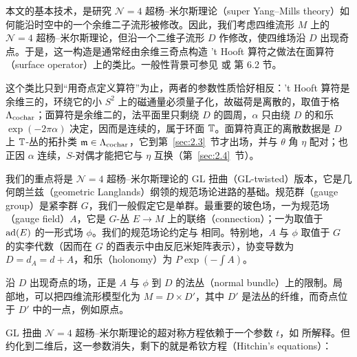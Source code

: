 本文的基本技术，是研究 $\mathcal N=4$ 超杨–米尔斯理论（super Yang–Mills theory）如何能沿时空中的一个余维二子流形被修改。因此，我们考虑四维流形 $M$ 上的 $\mathcal N=4$ 超杨–米尔斯理论，但沿一个二维子流形 $D$ 作修改，使四维场沿 $D$ 出现奇点。于是，这一构造是通常经由余维三奇点构造 't Hooft 算符之做法在面算符（surface operator）上的类比。一般性背景可参见 \cite{ref38} 或 \cite{ref8} 第 6.2 节。

\begin{yizhu}[物理图像补充]
这个类比只到“用奇点定义算符”为止，两者的参数性质恰好相反：'t Hooft 算符是余维三的，环绕它的小 $S^2$ 上的磁通量必须量子化，故磁荷是离散的，取值于格 $\Lambda_{\rm cochar}$；面算符是余维二的，法平面里只剩绕 $D$ 的圆周，$\alpha$ 只由绕 $D$ 的和乐 $\exp(-2\pi\alpha)$ 决定，因而是连续的，属于环面 ${\mathbb{T}}$。面算符真正的离散数据是 $D$ 上 ${\mathbb{T}}$-丛的拓扑类 $\mathfrak m\in\Lambda_{\rm cochar}$，它到第~\ref{sec:2.3}~节才出场，并与 $\theta$ 角 $\eta$ 配对；也正因 $\alpha$ 连续，$S$-对偶才能把它与 $\eta$ 互换（第~\ref{sec:2.4}~节）。
\end{yizhu}

我们的重点将是 $\mathcal N=4$ 超杨–米尔斯理论的 GL 扭曲（GL-twisted）版本，它是几何朗兰兹（geometric Langlands）纲领的规范场论进路的基础。规范群（gauge group）是紧李群 $G$，我们一般假定它是单群。最重要的玻色场，一为规范场（gauge field）$A$，它是 $G$-丛 $E\to M$ 上的联络（connection）；一为取值于 ${\rm ad}(E)$ 的一形式场 $\phi$。我们的规范场论约定与 \cite{ref8} 相同。特别地，$A$ 与 $\phi$ 取值于 $G$ 的实李代数（因而在 $G$ 的酉表示中由反厄米矩阵表示），协变导数为 $D=d_A=d+A$，和乐（holonomy）为 $P\exp\left(-\int A\right)$。

沿 $D$ 出现奇点的场，正是 $A$ 与 $\phi$ 到 $D$ 的法丛（normal bundle）上的限制。局部地，可以把四维流形模型化为 $M=D\times D'$，其中 $D'$ 是法丛的纤维，而奇点位于 $D'$ 中的一点，例如原点。

GL 扭曲 $\mathcal N=4$ 超杨–米尔斯理论的超对称方程依赖于一个参数 $t$，如 \cite{ref8} 所解释。但约化到二维后，这一参数消失，剩下的就是希钦方程（Hitchin's equations）：

